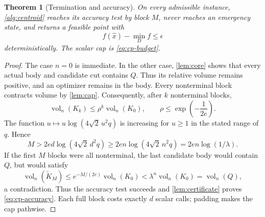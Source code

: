 \documentclass[11pt]{article}
\numberwithin{equation}{section}
\newtheorem{theorem}{Theorem}[section]
\theoremstyle{definition}
\theoremstyle{remark}
\newcommand{\eps}{\epsilon}
\DeclareMathOperator{\vol}{vol}
\begin{document}
\begin{theorem}[Termination and accuracy]\label{thm:centroid}
On every admissible instance, \cref{alg:centroid} reaches its accuracy test by block $M$, never reaches an emergency state, and returns a feasible point with
\begin{equation}\label{eq:cp-accuracy}
f(\widehat x)-\min_D f\le\eps
\end{equation}
deterministically. The scalar cap is \eqref{eq:cp-budget}.
\end{theorem}
\begin{proof}
The case $n=0$ is immediate. In the other case, \cref{lem:core} shows that every actual body and candidate cut contains $Q$. Thus its relative volume remains positive, and an optimizer remains in the body. Every nonterminal block contracts volume by \cref{lem:cap}. Consequently, after $k$ nonterminal blocks,
\[
\vol_n(K_k)\le\rho^k\vol_n(K_0),\qquad
\rho\le\exp\left(-\frac1{2e}\right).
\]
The function $u\mapsto u\log(4\sqrt2\,u^2q)$ is increasing for $u\ge1$ in the stated range of $q$. Hence
\[
M>2ed\log(4\sqrt2\,d^2q)
\ge2en\log(4\sqrt2\,n^2q)
=2en\log(1/\lambda).
\]
If the first $M$ blocks were all nonterminal, the last candidate body would contain $Q$, but would satisfy
\[
\vol_n(\widetilde K_M)
\le e^{-M/(2e)}\vol_n(K_0)
<\lambda^n\vol_n(K_0)=\vol_n(Q),
\]
a contradiction. Thus the accuracy test succeeds and \cref{lem:certificate} proves \eqref{eq:cp-accuracy}. Each full block costs exactly $d$ scalar calls; padding makes the cap pathwise.
\end{proof}
\end{document}
